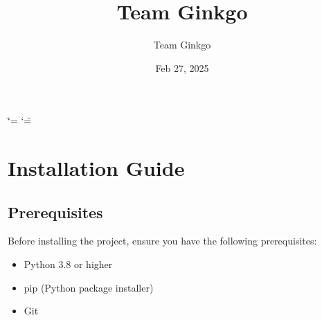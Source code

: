 \documentclass[letterpaper,10pt,english]{sphinxmanual}
\title{Team Ginkgo}
\date{Feb 27, 2025}
\author{Team Ginkgo}
\begin{document}
\ifdefined\shorthandoff
  \ifnum\catcode`\=\string=\active\shorthandoff{=}\fi
  \ifnum\catcode`\"=\active{}\fi
\fi

\pagestyle{empty}
\sphinxmaketitle
\pagestyle{plain}
\sphinxtableofcontents
\pagestyle{normal}
\label{\detokenize{index::doc}}


\sphinxstepscope


\chapter{Installation Guide}
\label{\detokenize{installation:installation-guide}}\label{\detokenize{installation:installation}}\label{\detokenize{installation::doc}}

\section{Prerequisites}
\label{\detokenize{installation:prerequisites}}
\sphinxAtStartPar
Before installing the project, ensure you have the following prerequisites:
\begin{itemize}
\item {} 
\sphinxAtStartPar
Python 3.8 or higher

\item {} 
\sphinxAtStartPar
pip (Python package installer)

\item {} 
\sphinxAtStartPar
Git

\end{itemize}
\end{document}
